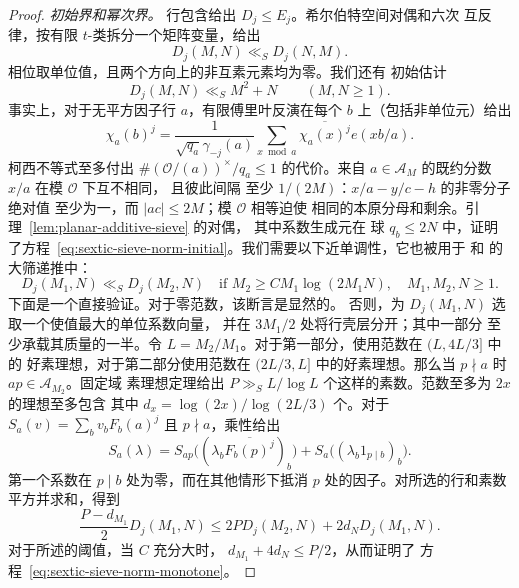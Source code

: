 \documentclass[11pt,a4paper]{article}
\numberwithin{equation}{section}
\numberwithin{figure}{section}
\theoremstyle{definition}
\theoremstyle{remark}
\begin{document}
\begin{proof}
\medskip\noindent\emph{初始界和幂次界。}
行包含给出 $D_j\le E_j$。希尔伯特空间对偶和六次
互反律，按有限 $t$-类拆分一个矩阵变量，给出
\begin{equation}\label{eq:sextic-sieve-norm-symmetry}
 D_j(M,N)\ll_S D_j(N,M).
\end{equation}
相位取单位值，且两个方向上的非互素元素均为零。我们还有
初始估计
\begin{equation}\label{eq:sextic-sieve-norm-initial}
 D_j(M,N)\ll_S M^2+N\qquad(M,N\ge1).
\end{equation}
事实上，对于无平方因子行 $a$，有限傅里叶反演在每个
$b$ 上（包括非单位元）给出
\[
 \chi_a(b)^j=\frac1{\sqrt{q_a}\gamma_{-j}(a)}
       \sum_{x\bmod a}\overline{\chi_a(x)^j}e(xb/a).
\]
柯西不等式至多付出 $\#(\mathcal O/(a))^\times/q_a\le1$ 的代价。来自
$a\in\mathcal A_M$ 的既约分数 $x/a$ 在模 $\mathcal O$ 下互不相同，
且彼此间隔
至少 $1/(2M)$：$x/a-y/c-h$ 的非零分子绝对值
至少为一，而 $|ac|\le2M$；模 $\mathcal O$ 相等迫使
相同的本原分母和剩余。引理~\ref{lem:planar-additive-sieve} 的对偶，
其中系数生成元在
球 $q_b\le2N$ 中，证明了方程~\eqref{eq:sextic-sieve-norm-initial}。我们需要以下近单调性，它也被用于 \cite[Lemma~4.4 and Remark~5]{GL} 和 \cite[Lemma~3.1]{BGL} 的大筛递推中：
\begin{equation}\label{eq:sextic-sieve-norm-monotone}
 D_j(M_1,N)\ll_S D_j(M_2,N)
 \quad\text{if }M_2\ge C M_1\log(2M_1N),\quad M_1,M_2,N\ge1.
\end{equation}
下面是一个直接验证。对于零范数，该断言是显然的。
否则，为 $D_j(M_1,N)$ 选取一个使值最大的单位系数向量，
并在 $3M_1/2$ 处将行壳层分开；其中一部分
至少承载其质量的一半。令 $L=M_2/M_1$。对于第一部分，使用范数在 $(L,4L/3]$ 中的
好素理想，对于第二部分使用范数在
$(2L/3,L]$ 中的好素理想。那么当 $p\nmid a$ 时 $ap\in\mathcal A_{M_2}$。固定域
素理想定理给出 $P\gg_S L/\log L$ 个这样的素数。范数至多为 $2x$ 的理想至多包含
其中 $d_x=\log(2x)/\log(2L/3)$ 个。对于
$S_a(v)=\sum_bv_bF_b(a)^j$ 且 $p\nmid a$，乘性给出
\[
 S_a(\lambda)=S_{ap}\bigl((\lambda_b\overline{F_b(p)^j})_b\bigr)
                  +S_a\bigl((\lambda_b1_{p\mid b})_b\bigr).
\]
第一个系数在 $p\mid b$ 处为零，而在其他情形下抵消 $p$ 处的因子。对所选的行和素数
平方并求和，得到
\[
 \frac{P-d_{M_1}}2D_j(M_1,N)
 \le2P D_j(M_2,N)+2d_ND_j(M_1,N).
\]
对于所述的阈值，当 $C$ 充分大时，
$d_{M_1}+4d_N\le P/2$，从而证明了
方程~\eqref{eq:sextic-sieve-norm-monotone}。


\end{proof}
\end{document}
